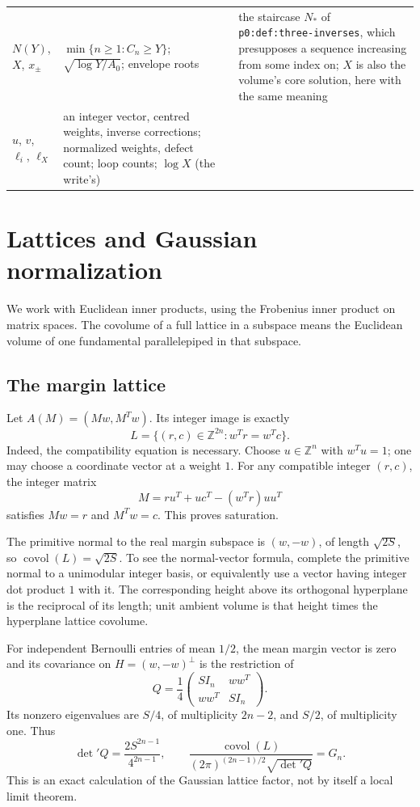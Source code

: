 \documentclass[11pt]{article}
\theoremstyle{definition}\newtheorem{definition}[theorem]{Definition}
\theoremstyle{remark}\newtheorem{remark}[theorem]{Remark}
\newcommand{\Z}{\mathbb Z}
\newcommand{\covol}{\operatorname{covol}}
\newcommand{\file}[1]{\nolinkurl{#1}}
\begin{document}
\begin{minipage}{\textwidth}
\begin{tabular}{@{}>{\raggedright\arraybackslash}p{0.9in}>{\raggedright\arraybackslash}p{3.05in}>{\raggedright\arraybackslash}p{2.15in}@{}}
$N(Y)$, $X$, $x_\pm$ & $\min\{n\ge1:C_n\ge Y\}$; $\sqrt{\log Y/A_0}$; envelope roots & the staircase $N_\ast$ of \file{p0:def:three-inverses}, which presupposes a sequence increasing from some index on; $X$ is also the volume's core solution, here with the same meaning\\
$u$, $v$, $\ell_i$, $\ell_X$ & an integer vector, centred weights, inverse corrections; normalized weights, defect count; loop counts; $\log X$ (the write's) & \\
\bottomrule
\end{tabular}
\endgroup
\end{minipage}

\section{Lattices and Gaussian normalization}\label{zsm:sec:lattice}
We work with Euclidean inner products, using the Frobenius inner product on
matrix spaces. The covolume of a full lattice in a subspace means the Euclidean
volume of one fundamental parallelepiped in that subspace.

\subsection{The margin lattice}
Let $A(M)=(Mw,M^Tw)$. Its integer image is exactly
\begin{equation}\label{zsm:eq:marginlattice}
 L=\{(r,c)\in\Z^{2n}:w^Tr=w^Tc\}.
\end{equation}
Indeed, the compatibility equation is necessary. Choose $u\in\Z^n$ with
$w^Tu=1$; one may choose a coordinate vector at a weight $1$. For any
compatible integer $(r,c)$, the integer matrix
\begin{equation}\label{zsm:eq:preimage}
 M=ru^T+uc^T-(w^Tr)uu^T
\end{equation}
satisfies $Mw=r$ and $M^Tw=c$. This proves saturation.

The primitive normal to the real margin subspace is $(w,-w)$, of length
$\sqrt{2S}$, so $\covol(L)=\sqrt{2S}$. To see the normal-vector formula,
complete the primitive normal to a unimodular integer basis, or equivalently
use a vector having integer dot product $1$ with it. The corresponding height
above its orthogonal hyperplane is the reciprocal of its length; unit ambient
volume is that height times the hyperplane lattice covolume.

For independent Bernoulli entries of mean $1/2$, the mean margin vector is zero
and its covariance on $H=(w,-w)^\perp$ is the restriction of
\[
 Q=\frac14\begin{pmatrix}S I_n&ww^T\\ww^T&S I_n\end{pmatrix}.
\]
Its nonzero eigenvalues are $S/4$, of multiplicity $2n-2$, and $S/2$, of
multiplicity one. Thus
\[
 \det{}'Q=\frac{2S^{2n-1}}{4^{2n-1}},\qquad
 \frac{\covol(L)}{(2\pi)^{(2n-1)/2}\sqrt{\det{}'Q}}=G_n.
\]
This is an exact calculation of the Gaussian lattice factor, not by itself a
local limit theorem.
\end{document}
